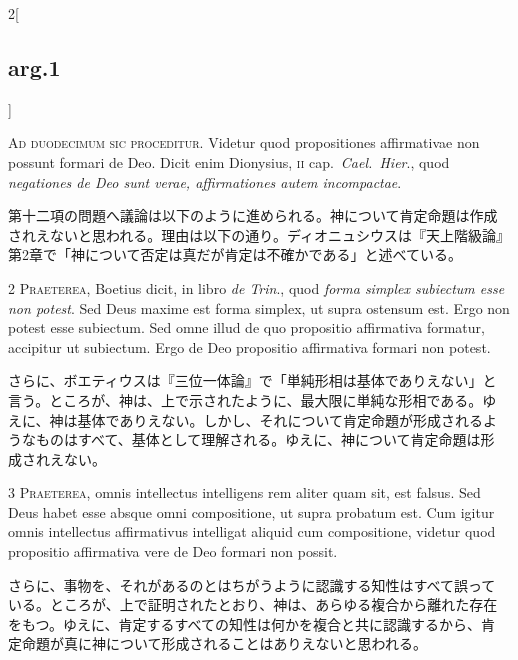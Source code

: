 \documentclass[paper=a4paper,fontsize=10pt,jafontsize=9pt,titlepage]{jlreq}
\begin{document}
\begin{paracol}{2}[\subsection{arg.1}]

{\huge A}{\scshape d duodecimum sic proceditur}. Videtur quod
propositiones affirmativae non possunt formari de Deo. Dicit enim
Dionysius, {\scshape ii} cap.~{\itshape Cael.~Hier}., quod {\itshape
negationes de Deo sunt verae, affirmationes autem incompactae}.

\switchcolumn

第十二項の問題へ議論は以下のように進められる。神について肯定命題は作成
されえないと思われる。理由は以下の通り。ディオニュシウスは『天上階級論』
第2章で「神について否定は真だが肯定は不確かである」と述べている。


{\scshape 2 Praeterea}, Boetius dicit, in libro {\itshape de Trin}.,
quod {\itshape forma simplex subiectum esse non potest}. Sed Deus
maxime est forma simplex, ut supra ostensum est. Ergo non potest esse
subiectum. Sed omne illud de quo propositio affirmativa formatur,
accipitur ut subiectum. Ergo de Deo propositio affirmativa formari non
potest.

\switchcolumn

さらに、ボエティウスは『三位一体論』で「単純形相は基体でありえない」と
言う。ところが、神は、上で示されたように、最大限に単純な形相である。ゆ
えに、神は基体でありえない。しかし、それについて肯定命題が形成されるよ
うなものはすべて、基体として理解される。ゆえに、神について肯定命題は形
成されえない。


{\scshape 3 Praeterea}, omnis intellectus intelligens rem aliter quam
sit, est falsus. Sed Deus habet esse absque omni compositione, ut
supra probatum est. Cum igitur omnis intellectus affirmativus
intelligat aliquid cum compositione, videtur quod propositio
affirmativa vere de Deo formari non possit.

\switchcolumn

さらに、事物を、それがあるのとはちがうように認識する知性はすべて誤って
いる。ところが、上で証明されたとおり、神は、あらゆる複合から離れた存在
をもつ。ゆえに、肯定するすべての知性は何かを複合と共に認識するから、肯
定命題が真に神について形成されることはありえないと思われる。


\end{paracol}
\end{document}

